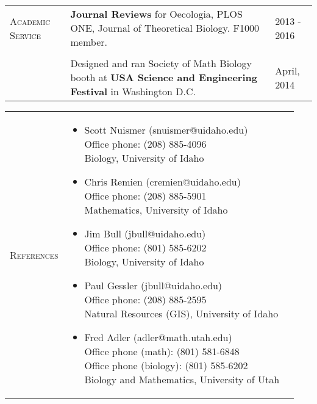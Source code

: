 \documentclass[11pt]{article}
\newcommand{\cellone}{2.5cm}
\newcommand{\celltwo}{12cm}
\newcommand{\cellthree}{4cm}
\newcommand{\spa}{\vspace{.4in}}
\begin{document}
\spa

\begin{tabularx}{\textwidth}{p{\cellone} p{\celltwo} p{\cellthree}}
\parbox[t][]{\cellone}{A\textsc{cademic} S\textsc{ervice}} & \parbox[t][0cm]{\celltwo}{{\bf Journal Reviews} for Oecologia, PLOS ONE, Journal of Theoretical Biology.  F1000 member. } & \parbox[t][]{\cellthree}{2013 - 2016} \\ \\
                                                                                                      & \parbox[t][0cm]{\celltwo}{Designed and ran Society of Math Biology booth at {\bf USA Science and Engineering Festival} in Washington D.C.} & \parbox[t][]{\cellthree}{April, 2014} \\ 

\end{tabularx}

\spa

\begin{tabularx}{\textwidth}{p{\cellone} p{\celltwo} p{\cellthree}}
  \parbox[t][0cm]{\cellone}{R\textsc{eferences}} & \parbox[t][0cm]{6cm}{
    
    \begin{itemize}
      
    \item \parbox[t]{10cm}{Scott Nuismer (snuismer@uidaho.edu)  \\ Office phone: (208) 885-4096   \\ Biology, University of Idaho}
      
    \item \parbox[t]{10cm}{Chris Remien (cremien@uidaho.edu) \\ Office phone: (208) 885-5901 \\ Mathematics, University of Idaho}

    \item \parbox[t]{10cm}{Jim Bull (jbull@uidaho.edu) \\ Office phone: (801) 585-6202 \\ Biology, University of Idaho}

    \item \parbox[t]{10cm}{Paul Gessler (jbull@uidaho.edu) \\ Office phone: (208) 885-2595 \\ Natural Resources (GIS), University of Idaho}
      
    \item \parbox[t]{10cm}{Fred Adler (adler@math.utah.edu) \\ Office phone (math): (801) 581-6848 \\ Office phone (biology): (801) 585-6202 \\ Biology and Mathematics, University of Utah}
      
    \end{itemize}
  }
  
\end{tabularx}
\end{document}
